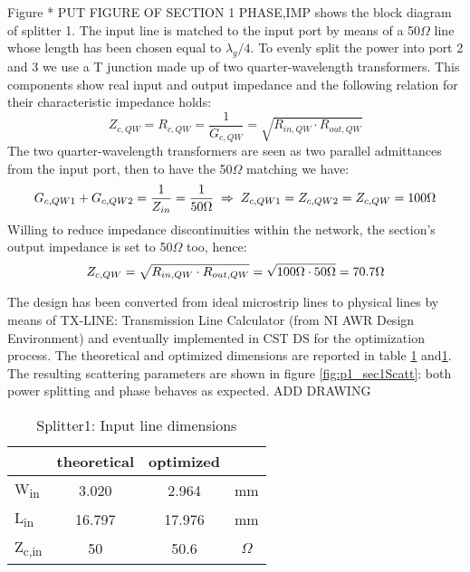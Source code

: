Figure * PUT FIGURE OF SECTION 1 PHASE,IMP shows the block diagram of splitter 1. The input line is matched to the input port by means of a 50$\Omega$ line whose length has been chosen equal to $\lambda_{g}/4$. To evenly split the power into port 2 and 3 we use a T junction made up of two quarter-wavelength transformers. This components show real input and output impedance and the following relation for their characteristic impedance holds:
\begin{equation}
	\label{eq:p1_ZcQW}
	Z_{c,QW} =R_{c,QW}=\frac{1}{G_{c,QW}}= \sqrt{R_{in,QW}\cdot R_{out,QW}} 
\end{equation}
The two quarter-wavelength transformers are seen as two parallel admittances from the input port, then to have the 50$\Omega$ matching we have:
\begin{equation}
	G_{c,QW1}+G_{c,QW2}=\frac{1}{Z_{in}}=\frac{1}{50\Omega} \; \Rightarrow \; Z_{c,QW1}=Z_{c,QW2}=Z_{c,QW}=100\Omega \notag
\end{equation}
 Willing to reduce impedance discontinuities within the network, the section's output impedance is set to 50$\Omega$ too, hence:
\begin{equation}
	Z_{c,QW}= \sqrt{R_{in,QW}\cdot R_{out,QW}}=\sqrt{100\Omega\cdot 50\Omega}=70.7\Omega \notag
\end{equation}

The design has been converted from ideal microstrip lines to physical lines by means of TX-LINE: Transmission Line Calculator (from NI AWR Design Environment) and eventually implemented in CST DS\texttrademark{} for the optimization process. The theoretical and optimized dimensions are reported in table \ref{tab:p1_sec1DimIN} and\ref{tab:p1_sec1DimIN}. The resulting scattering parameters are shown in figure \ref{fig:p1_sec1Scatt}: both power splitting and phase behaves as expected. ADD DRAWING
\begin{table} [h]
	\label{tab:p1_sec1DimIN}
	\caption{Splitter1: Input line dimensions}
	\centering	
	\begin{tabular}{lccc} 
		\toprule
			& theoretical & optimized&\\
		\midrule 
		W\textsubscript{in} 	&	3.020		&	2.964	 & mm 		\\
		L\textsubscript{in}		&	16.797		& 	17.976		& mm	\\ 
		Z\textsubscript{c,in}	& 	50 & 50.6	&$\Omega$ \\
		\bottomrule
	\end{tabular}	
\end{table}


